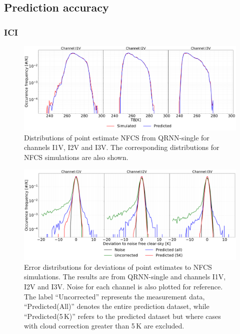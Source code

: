 \documentclass[amt, manuscript]{copernicus}
\begin{document}
\subsection{Prediction accuracy}
\subsubsection{ICI}
%
\begin{figure}[t]
	\includegraphics[width=\textwidth]{Figures/PDF_predictions_ICI.pdf} 
	\caption{Distributions of point estimate NFCS from QRNN-single for channels I1V, I2V and I3V. The corresponding distributions for NFCS simulations are also shown.}
	\label{fig:PDF_predictions}	
\end{figure}
\begin{figure}[t ]
	\includegraphics[width=\textwidth]{Figures/error_distribution_QRNN-single.pdf} 
	\caption{Error distributions for deviations of point estimates to NFCS simulations. The results are from QRNN-single and channels I1V, I2V and I3V. Noise for each channel is also plotted for reference. The label ``Uncorrected'' represents the measurement data, ``Predicted(All)'' denotes the entire prediction dataset, while ``Predicted(5\,K)'' refers to the predicted dataset but where cases with cloud correction greater than 5\,K are excluded.}
	\label{fig:error_distributions}	
\end{figure}
\end{document}

